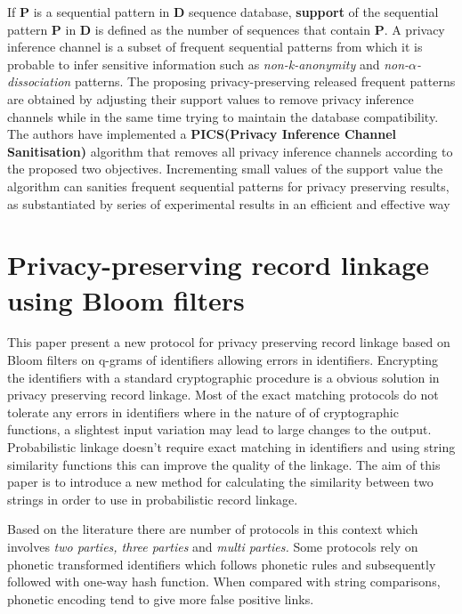 \documentclass[a4paper]{article}
\begin{document}
If \textbf{P} is a sequential pattern in \textbf{D} sequence database, \textbf{support} of the sequential pattern \textbf{P} in \textbf{D} is defined as the number of sequences that contain \textbf{P}. A privacy inference channel is a subset of frequent sequential patterns from which it is probable to infer sensitive information such as \textit{non-k-anonymity} and \textit{non-$\alpha$-dissociation} patterns. The proposing privacy-preserving released frequent patterns are obtained by adjusting their support values to remove privacy inference channels while in the same time trying to maintain the database compatibility. The authors have implemented a \textbf{PICS(Privacy Inference Channel Sanitisation)} algorithm that removes all privacy inference channels according to the proposed two objectives. Incrementing small values of the support value the algorithm can sanities frequent sequential patterns for privacy preserving results, as substantiated by series of experimental results in an efficient and effective way

\section*{Privacy-preserving record linkage using Bloom filters}

This paper \cite{Schnell2009} present a new protocol for privacy preserving record linkage based on Bloom filters on q-grams of identifiers allowing errors in identifiers. Encrypting the identifiers with a standard cryptographic procedure is a obvious solution in privacy preserving record linkage. Most of the exact matching protocols do not tolerate any errors in identifiers where in the nature of of cryptographic functions, a slightest input variation may lead to large changes to the output. Probabilistic linkage doesn't require exact matching in identifiers and using string similarity functions this can improve the quality of the linkage. The aim of this paper is to introduce a new method for calculating the similarity between two strings in order to use in probabilistic record linkage.

Based on the literature there are number of protocols in this context which involves \textit{two parties, three parties} and \textit{multi parties.} Some protocols rely on phonetic transformed identifiers which follows phonetic rules and subsequently followed with one-way hash function. When compared with string comparisons, phonetic encoding tend to give more false positive links.
\end{document}
